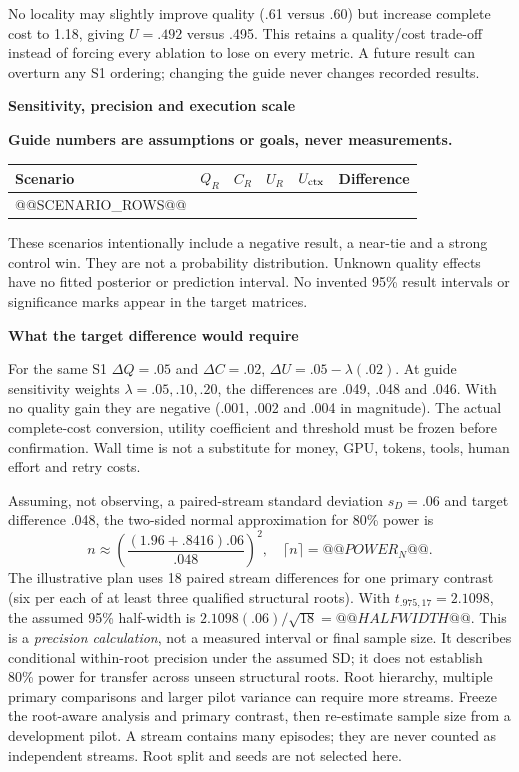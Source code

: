 \documentclass[10pt,a4paper]{article}
\newcommand{\status}{\textcolor{red!70!black}{\textbf{Guide numbers are assumptions or goals, never measurements.}}\par}
\newcommand{\lead}[1]{\vspace{4pt}\textbf{#1}\par}
\begin{document}
No locality may slightly improve quality (.61 versus .60) but increase complete
cost to 1.18, giving $U=.492$ versus .495. This retains a quality/cost trade-off
instead of forcing every ablation to lose on every metric. A future result can
overturn any S1 ordering; changing the guide never changes recorded results.

\clearpage
\lead{Sensitivity, precision and execution scale}
\status
\begin{center}\small
\begin{tabular*}{\linewidth}{@{\extracolsep{\fill}}lrrrrr@{}}\toprule
Scenario & $Q_R$ & $C_R$ & $U_R$ & $U_{\rm ctx}$ & Difference\\\midrule
@@SCENARIO_ROWS@@
\bottomrule\end{tabular*}\end{center}
These scenarios intentionally include a negative result, a near-tie and a strong
control win. They
are not a probability distribution. Unknown quality effects have no fitted
posterior or prediction interval. No invented 95\% result intervals or
significance marks appear in the target matrices.

\lead{What the target difference would require}
For the same S1 $\Delta Q=.05$ and $\Delta C=.02$,
$\Delta U=.05-\lambda(.02)$. At guide sensitivity weights
$\lambda=.05,.10,.20$, the differences are .049, .048 and .046.
With no quality gain they are negative (.001, .002 and .004 in magnitude).
The actual complete-cost conversion, utility coefficient and threshold must be
frozen before confirmation. Wall time is not a substitute for money, GPU,
tokens, tools, human effort and retry costs.

Assuming, not observing, a paired-stream standard deviation $s_D=.06$ and
target difference .048, the two-sided normal approximation for 80\% power is
\[
 n\approx\left(\frac{(1.96+.8416).06}{.048}\right)^2,
 \quad \lceil n\rceil=@@POWER_N@@.
\]
The illustrative plan uses 18 paired stream differences for one primary contrast
(six per each of at least three qualified structural roots). With
$t_{.975,17}=2.1098$, the assumed
95\% half-width is $2.1098(.06)/\sqrt{18}=@@HALFWIDTH@@$.
This is a \emph{precision calculation}, not a measured interval or final sample
size. It describes conditional within-root precision under the assumed SD; it
does not establish 80\% power for transfer across unseen structural roots.
Root hierarchy, multiple primary comparisons and larger pilot variance can
require more streams. Freeze the root-aware analysis and primary contrast, then
re-estimate sample size from a development pilot. A stream contains many episodes; they are never
counted as independent streams. Root split and seeds are not selected here.
\end{document}
